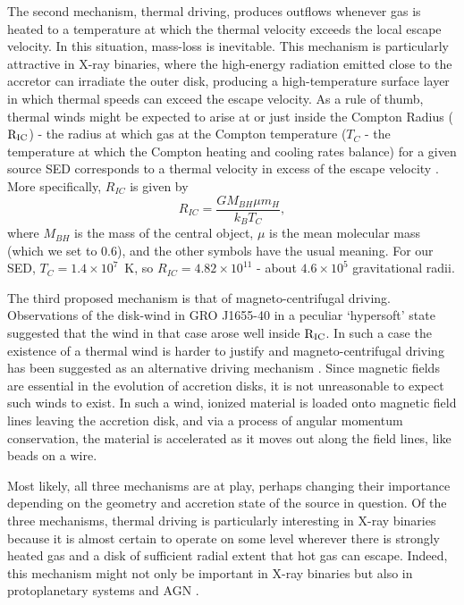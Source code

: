 \documentclass[a4paper,fleqn,usenatbib]{mnras}
\begin{document}
The second mechanism, thermal driving, produces outflows whenever gas
is heated to a temperature at which the thermal velocity exceeds
the local escape velocity. In this situation, mass-loss is
inevitable. This mechanism is particularly attractive in 
X-ray binaries, where the high-energy radiation emitted close to the
accretor can irradiate the outer disk, producing a high-temperature
surface layer in which thermal speeds can exceed the escape velocity. As a rule of thumb, thermal winds might be expected
to arise at or just inside the Compton Radius ($\rm{R_{IC}}$) - the radius at which gas at the Compton temperature ($T_C$ - 
the temperature at which the Compton heating and cooling rates balance)
for a given source SED corresponds to a thermal velocity in excess of
the escape velocity \citep{1983ApJ...271...70B}. More specifically,
$R_{IC}$ is given by 
\begin{equation}
R_{IC}=\frac{GM_{BH}\mu m_H}{k_BT_C},
\end{equation}
where $M_{BH}$ is the mass of the central object, $\mu$ is the 
mean molecular mass (which we set to 0.6), and the other symbols have the usual meaning. 
For our SED, $T_C=1.4\times10^7$~K, so $R_{IC}=4.82\times10^{11}$ - about $4.6\times10^5$ gravitational
radii.



The third proposed mechanism is that of magneto-centrifugal driving. 
Observations of the disk-wind in GRO J1655-40 in a peculiar `hypersoft' state suggested that the wind in that
case arose well inside $\rm{R_{IC}}$. In such a case the existence of a thermal wind is harder to justify 
and magneto-centrifugal driving has been suggested as an alternative driving mechanism
\citep[but also see \citealt{2006ApJ...652L.117N,2015MNRAS.451..475U,2016ApJ...823..159S}]
{1992ApJS...80..753S,2006Natur.441..953M,2008ApJ...680.1359M,2009ApJ...701..865K}. Since
magnetic fields are essential in the evolution of accretion disks, it is not unreasonable to expect such winds to 
exist. In such a wind, ionized material is loaded onto magnetic field lines leaving the accretion disk, and via a process
of angular momentum conservation, the material is accelerated as it moves out along the field lines, like beads
on a wire.

Most likely, all three mechanisms are at play, perhaps changing their importance depending on the
geometry and accretion state of the source in question. Of the three mechanisms, thermal driving is 
particularly interesting in X-ray binaries because it is almost certain to 
operate on some level wherever there is strongly heated gas and a disk of sufficient radial extent that hot gas 
can escape. Indeed, this mechanism might not only be important in X-ray binaries but also in protoplanetary systems \cite[e.g.][]{2012MNRAS.422.1880O} and AGN \cite[e.g.][]{2018MNRAS.476.4395B}.
\end{document}
